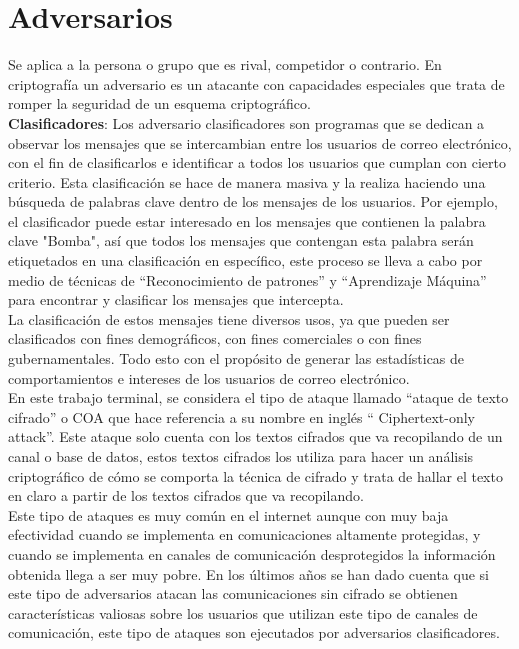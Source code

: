 \documentclass[12pt,oneside,onecolumn,openany]{report}
\begin{document}
\section{Adversarios}
Se aplica a la persona o grupo que es rival, competidor o contrario. En criptografía un adversario es un atacante con capacidades especiales que trata de romper la seguridad de un esquema criptográfico.\\
\textbf{Clasificadores}:
Los adversario clasificadores son programas que se dedican a observar los mensajes que se intercambian  entre  los  usuarios  de  correo  electrónico,  con  el  fin  de  clasificarlos  e 
identificar  a  todos  los  usuarios  que  cumplan  con  cierto  criterio.  Esta  clasificación  se hace de manera masiva y la realiza haciendo una búsqueda de palabras clave dentro de 
los  mensajes de  los usuarios. Por ejemplo, el  clasificador puede estar interesado en  los mensajes  que  contienen  la  palabra  clave  "Bomba",  así  que 
todos  los  mensajes  que contengan esta palabra serán etiquetados en una clasificación en específico, este proceso se lleva a cabo por medio de técnicas de 
“Reconocimiento de patrones” y “Aprendizaje Máquina” para encontrar y clasificar los mensajes que intercepta.\cite{clas,Attacks}
\\
La  clasificación  de  estos  mensajes  tiene  diversos  usos, ya  que  pueden  ser  clasificados con  fines demográficos, con  fines comerciales o con  fines gubernamentales. Todo esto 
con  el  propósito  de  generar  las  estadísticas  de  comportamientos  e  intereses  de  los usuarios de correo electrónico. \\




En este trabajo terminal, se considera el tipo de ataque llamado “ataque  de  texto  cifrado” o COA  que  hace  referencia  a  su  nombre  en  inglés “
Ciphertext-only  attack”\cite{Ciphertextonly}.  Este ataque  solo  cuenta  con  los  textos  cifrados  que  va  recopilando  de  un  canal  o  base  de 
datos,  estos  textos  cifrados  los  utiliza  para  hacer  un  análisis  criptográfico  de  cómo  se comporta la técnica de cifrado  y trata de hallar el texto en claro a partir de los textos cifrados que va recopilando. 
\\
Este  tipo  de  ataques  es  muy  común  en  el  internet  aunque  con  muy  baja  efectividad cuando   se   implementa   en   comunicaciones   altamente   protegidas,   y   cuando   se 
implementa en canales de comunicación desprotegidos  la  información obtenida  llega  a ser  muy  pobre.  En  los  últimos  años  se  han  dado  cuenta  que  si   este  tipo  de 
adversarios   atacan las  comunicaciones  sin  cifrado se  obtienen  características  valiosas  sobre  los usuarios  que  utilizan  este  tipo  de  canales  de  comunicación,  este  tipo  de  ataques  son 
ejecutados por  adversarios clasificadores.\\
\end{document}
